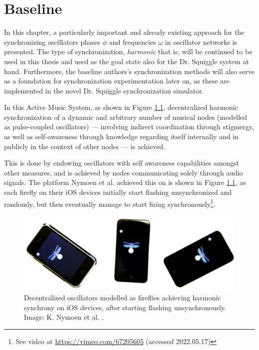 \chapter{Baseline}
\label{chap:baseline}

In this chapter, a particularly important and already existing approach for the synchronizing oscillators phases $\phi$ and frequencies $\omega$ in oscillator networks is presented. The type of synchronization, \textit{harmonic} that is, will be continued to be used in this thesis and used as the goal state also for the Dr. Squiggle system at hand. Furthermore, the baseline authors's synchronization methods will also serve as a foundation for synchronization experimentation later on, as these are implemented in the novel Dr. Squiggle synchronization simulator.

In this Active Music System, as shown in Figure \ref{fig:nymoen_fireflies_on_ios_devices}, decentralized harmonic synchronization of a dynamic and arbitrary number of musical nodes (modelled as pulse-coupled oscillators) — involving indirect coordination through stigmergy, as well as self-awareness through knowledge regarding itself internally and in publicly in the context of other nodes — is achieved.

This is done by endowing oscillators with self awareness capabilities amongst other measures, and is achieved by nodes communicating solely through audio signals. The platform Nymoen et al. achieved this on is shown in Figure \ref{fig:nymoen_fireflies_on_ios_devices}, as each firefly on their iOS devices initially start flashing unsynchronized and randomly, but then eventually manage to start firing synchronously\footnote{See video at \url{https://vimeo.com/67205605} (accessed 2022.05.17)}.

\begin{figure}[ht!]
	\centering
	\includegraphics[width=0.7\linewidth]{Assets/DocSegments/Chapters/Baseline/Figures/Illustrations/fireflies_on_ios_devices.png}
	\caption[]{Decentralized oscillators modelled as fireflies achieving harmonic synchrony on iOS devices, after starting flashing unsynchronously. Image: K. Nymoen et al. \cite{nymoen_synch}.}
	\label{fig:nymoen_fireflies_on_ios_devices}
\end{figure}

